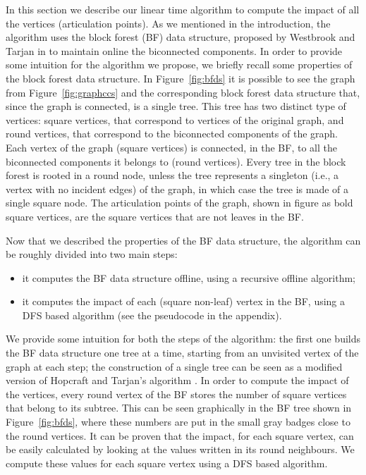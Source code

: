 \documentclass{llncs}
\begin{document}
In this section we describe our linear time algorithm to compute the impact of all the vertices (articulation points). As we mentioned in the introduction, the algorithm uses the block forest (BF) data structure, proposed by Westbrook and Tarjan in \cite{WT92} to maintain online the biconnected components. In order to provide some intuition for the algorithm we propose, we briefly recall some properties of the block forest data structure. In Figure~\ref{fig:bfds} it is possible to see the graph from Figure~\ref{fig:graphccs} and the corresponding block forest data structure that, since the graph is connected, is a single tree. This tree has two distinct type of vertices: square vertices, that correspond to vertices of the original graph, and round vertices, that correspond to the biconnected components of the graph. Each  vertex of the graph (square vertices) is connected, in the BF, to all the biconnected components it belongs to (round vertices). Every tree in the block forest is rooted in a round node, unless the tree represents a singleton (i.e., a vertex with no incident edges) of the graph, in which case the tree is made of a single square node. The articulation points of the graph, shown in figure as bold square vertices, are the square vertices that are not leaves in the BF. 

Now that we described the properties of the BF data structure, the algorithm can be roughly divided into two main steps:
\begin{itemize}
\item it computes the BF data structure offline, using a recursive offline algorithm;
\item it computes the impact of each (square non-leaf) vertex in the BF, using a DFS based algorithm (see the pseudocode in the appendix).
\end{itemize}

We provide some intuition for both the steps of the algorithm: the first one builds the BF data structure one tree at a time, starting from an unvisited vertex of the graph at each step; the construction of a single tree can be seen as a modified version of Hopcraft and Tarjan's algorithm \cite{HT73}. In order to compute the impact of the vertices, every round vertex of the BF stores the number of square vertices that belong to its subtree. This can be seen graphically in the BF tree shown in Figure~\ref{fig:bfds}, where these numbers are put in the small gray badges close to the round vertices. It can be proven that the impact, for each square vertex, can be easily calculated by looking at the values written in its round neighbours. We compute these values for each square vertex using a DFS based algorithm.
\end{document}
